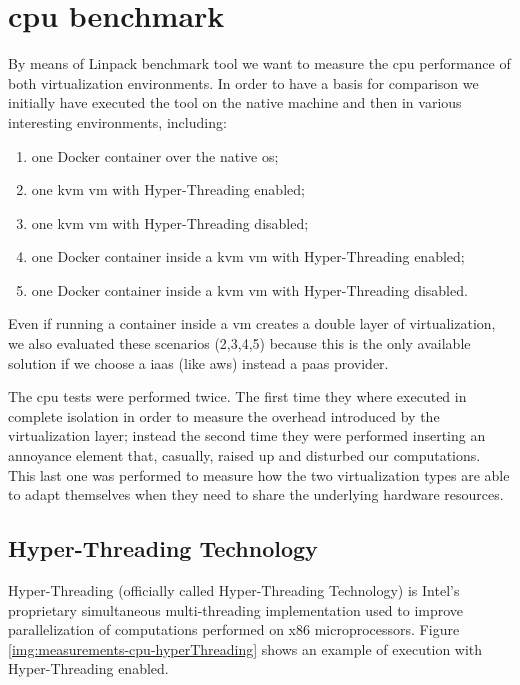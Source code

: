 %
%
\section{\acs{cpu} benchmark}
\label{sec:measurements-cpu}
By means of Linpack benchmark tool we want to measure the \acs{cpu} performance of both virtualization
environments. In order to have a basis for comparison we initially have executed the tool on the native
machine and then in various interesting environments, including:

\begin{enumerate}
	\item{one Docker container over the native \acs{os};}
	\item{one \ac{kvm} \ac{vm} with Hyper-Threading enabled;}
	\item{one \ac{kvm} \ac{vm} with Hyper-Threading disabled;}
	\item{one Docker container inside a \ac{kvm} \ac{vm} with Hyper-Threading enabled;}
	\item{one Docker container inside a \ac{kvm} \ac{vm} with Hyper-Threading disabled.}
\end{enumerate}

Even if running a container inside a \ac{vm} creates a double layer of virtualization, we also evaluated
these scenarios (2,3,4,5) because this is the only available solution if we choose a \ac{iaas} (like 
\ac{aws}) instead a \ac{paas} provider.

The \acs{cpu} tests were performed twice. The first time they where executed in complete isolation
in order to measure the overhead introduced by the virtualization layer; instead the second time they
were performed inserting an annoyance element that, casually, raised up and disturbed our computations.
This last one was performed to measure how the two virtualization types are able to adapt themselves
when they need to share the underlying hardware resources.

\subsection{Hyper-Threading Technology}
\label{sec:measurements-cpu-hyperThreadingTechnology}
Hyper-Threading (officially called Hyper-Threading Technology) is Intel's proprietary simultaneous
multi-threading implementation used to improve parallelization of computations performed on x86
microprocessors. Figure \ref{img:measurements-cpu-hyperThreading} shows an example of execution with
Hyper-Threading enabled.


